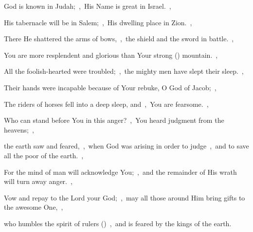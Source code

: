 \documentclass[12pt,twoside,a5paper]{article}
\begin{document}
\begin{halfparskip}
   God is known in Judah;~\sep\ His Name is great in Israel.~\sep

  His tabernacle will be in Salem;~\sep\ His dwelling place in Zion.~\sep

  There He shattered the arms of bows,~\sep\ the shield and the sword in battle.~\sep

  You are more resplendent and glorious than Your strong () mountain.~\sep

  All the foolish-hearted were troubled;~\sep\ the mighty men have slept their sleep.~\sep

  Their hands were incapable because of Your rebuke, O God of Jacob;~\sep

  The riders of horses fell into a deep sleep, and~\sep\ You are fearsome.~\sep

  Who can stand before You in this anger?~\sep\ You heard judgment from the heavens;~\sep

  the earth saw and feared,~\sep\ when God was arising in order to judge~\sep\ and to save all the poor of the earth.~\sep

  For the mind of man will acknowledge You;~\sep\ and the remainder of His wrath will turn away anger.~\sep

  Vow and repay to the Lord your God;~\sep\ may all those around Him bring gifts to the awesome One,~\sep

  who humbles the spirit of rulers ()~\sep\ and is feared by the kings of the earth.
\end{halfparskip}
\end{document}
